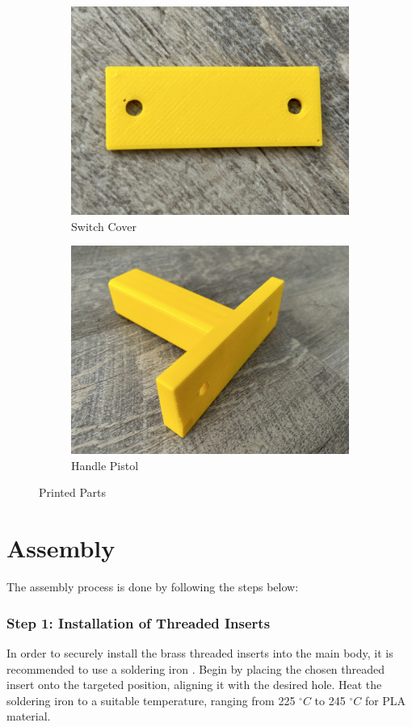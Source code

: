\begin{figure}[h!]
\begin{subfigure}[c]{0.45\textwidth}
        \label{fig:printed_battery_cover}
    \end{subfigure}
    \begin{subfigure}[c]{0.45\textwidth}
        \begin{minipage}{\textwidth}
            \centering
            \includegraphics[height=4 cm]{texs/Part1/chapter5/image/res_switch.jpg}
        \end{minipage}
        \caption{Switch Cover}
        \label{fig:printed_switch_cover}
    \end{subfigure}
    \begin{subfigure}[c]{0.45\textwidth}
        \begin{minipage}{\textwidth}
            \centering
            \includegraphics[height=4 cm]{texs/Part1/chapter5/image/res_grip.jpg}
        \end{minipage}
        \caption{Handle Pistol}
        \label{fig:printed_handle_pistol}
    \end{subfigure}
    \caption{Printed Parts}
    \label{fig:printedparts}
\end{figure}

\section{Assembly}
\label{sec:assembly}

The assembly process is done by following the steps below:

\subsubsection{Step 1: Installation of Threaded Inserts}
In order to securely install the brass threaded inserts into the main body, it is recommended to use a soldering iron \cite{Hermann23}. Begin by placing the chosen threaded insert onto the targeted position, aligning it with the desired hole. Heat the soldering iron to a suitable temperature, ranging from 225 $^{\circ}C$ to 245 $^{\circ}C$ for PLA material.

